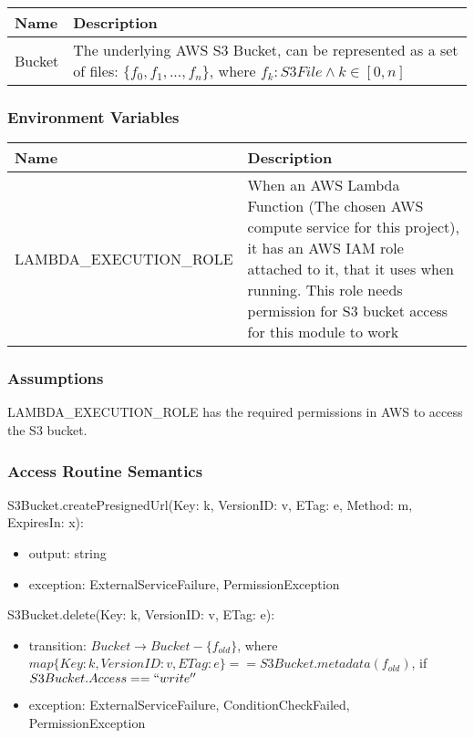 \documentclass[12pt, titlepage]{article}
\begin{document}
\begin{center}
  \begin{tabular}{p{4cm} p{12cm}}
    \hline
    \textbf{Name} & \textbf{Description} \\
    \hline
    Bucket & The underlying AWS S3 Bucket, can be represented
    as a set of files: $\{f_0, f_1, ..., f_n\}$, where $f_k: S3File
    \land k\in[0,n]$ \\
    \hline
  \end{tabular}
\end{center}

\subsubsection{Environment Variables}

\begin{center}
  \begin{tabular}{p{6cm} p{10cm}}
    \hline
    \textbf{Name} & \textbf{Description} \\
    \hline
    LAMBDA\_EXECUTION\_ROLE & When an AWS Lambda Function (The chosen
    AWS compute service for this project), it has an AWS IAM role
    attached to it, that it uses when running. This role needs
    permission for S3 bucket access for this module to work \\
    \hline
  \end{tabular}
\end{center}

\subsubsection{Assumptions}

LAMBDA\_EXECUTION\_ROLE has the required permissions in AWS to access
the S3 bucket.

\subsubsection{Access Routine Semantics}

\noindent S3Bucket.createPresignedUrl(Key: k, VersionID: v, ETag: e,
Method: m, ExpiresIn: x):
\begin{itemize}
  \item output: string
  \item exception: ExternalServiceFailure, PermissionException
\end{itemize}

\noindent S3Bucket.delete(Key: k, VersionID: v, ETag: e):
\begin{itemize}
  \item transition: $Bucket \rightarrow Bucket - \{f_{old}\}$, where
    $map\{Key: k, VersionID: v, ETag:
    e\}==S3Bucket.metadata(f_{old})$, if $S3Bucket.Access == ``write''$
  \item exception: ExternalServiceFailure, ConditionCheckFailed,
    PermissionException
\end{itemize}
\end{document}
